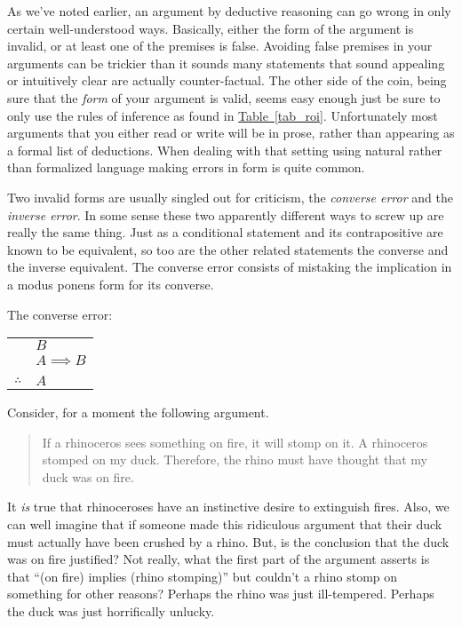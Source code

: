 \documentclass[10pt,]{book}
\theoremstyle{plain}
\theoremstyle{definition}
\theoremstyle{definition}
\numberwithin{equation}{section}
\newcommand{\hrulethin}  {\noalign{\hrule height 0.04em}}
\begin{document}
    As we've noted earlier, an argument by deductive reasoning can go wrong
    in only certain well-understood ways. Basically, either the form of the
    argument is invalid, or at least one of the premises is false. Avoiding
    false premises in your arguments can be trickier than it sounds \textemdash{} many
    statements that sound appealing or intuitively clear are actually
    counter-factual. The other side of the coin, being sure that the
    \emph{form}
    of your argument is valid, seems easy enough \textemdash{} just be
    sure to only use the rules of inference as found in \hyperref[tab_roi]{Table~\ref{tab_roi}}.
    Unfortunately most arguments that you either read or write
    will be in prose, rather than appearing as a formal list of deductions.
    When dealing with that setting \textemdash{} using natural rather than formalized
    language \textemdash{} making errors in form is quite common.
\par

    Two invalid forms are usually singled out for criticism, the
    \emph{converse error} and the
    \emph{inverse error}. In some sense
    these two apparently different ways to screw up are really the same thing.
    Just as a conditional statement and its contrapositive are known to be
    equivalent, so too are the other related statements \textemdash{} the
    converse and the inverse \textemdash{} equivalent. The converse error consists of
    mistaking the implication in a modus ponens form for its converse.
\par

    The converse error:
\begin{tabular}{ll}
&\(B\)\tabularnewline[0pt]
&\(A \implies B\)\tabularnewline[0pt]
&\tabularnewline\hrulethin
\(\therefore\)&\(A\)
\end{tabular}
\par

    Consider, for a moment the following argument.
\begin{quote}
  If a rhinoceros sees something on fire, it will stomp on it. 
  A rhinoceros stomped on my duck. 
  Therefore, the rhino must have thought that my duck was on fire.
  \end{quote}
\par

    It \emph{is} true that rhinoceroses have an instinctive desire to extinguish
    fires. Also, we can well imagine that if someone made this ridiculous
    argument that their duck must actually have been crushed by a rhino. But,
    is the conclusion that the duck was on fire justified? Not really, what
    the first part of the argument asserts is that ``(on fire) implies (rhino
    stomping)'' but couldn't a rhino stomp on something for other reasons?
    Perhaps the rhino was just ill-tempered. Perhaps the duck was just
    horrifically unlucky.
\par
\end{document}
